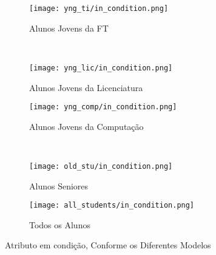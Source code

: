 \clearpage
\begin{figure}[!ht]
    \centering
    \begin{subfigure}[b]{0.48\textwidth}
        \centering
        \texttt{[image: yng\_ti/in\_condition.png]}
        \caption{Alunos Jovens da FT}
    \end{subfigure}
    ~
    \begin{subfigure}[b]{0.48\textwidth}
        \centering
        \texttt{[image: yng\_lic/in\_condition.png]}
        \caption{Alunos Jovens da Licenciatura}
    \end{subfigure}

    \begin{subfigure}[b]{0.48\textwidth}
        \centering
        \texttt{[image: yng\_comp/in\_condition.png]}
        \caption{Alunos Jovens da Computação}
    \end{subfigure}
    ~
    \begin{subfigure}[b]{0.48\textwidth}
        \centering
        \texttt{[image: old\_stu/in\_condition.png]}
        \caption{Alunos Seniores}
    \end{subfigure}

    \begin{subfigure}[b]{0.48\textwidth}
        \centering
        \texttt{[image: all\_students/in\_condition.png]}
        \caption{Todos os Alunos}
    \end{subfigure}
    \caption{Atributo em condição, Conforme os Diferentes Modelos}
\end{figure}

